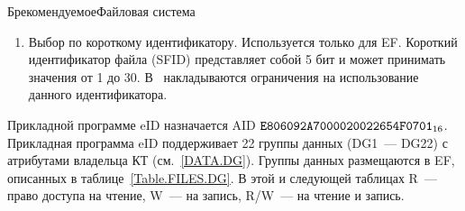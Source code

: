 \begin{appendix}{Б}{рекомендуемое}{Файловая система}
\begin{enumerate}
\item
Выбор по короткому идентификатору. Используется только для EF. Короткий
идентификатор файла (SFID) представляет собой 5 бит и может принимать значения
от 1 до 30. В~\cite{APDU} накладываются ограничения на использование данного
идентификатора.
\end{enumerate}


Прикладной программе eID назначается AID $\texttt{E806092A7000020022654F0701}_{16}$. 
%
Прикладная программа eID поддерживает 22 группы 
данных (DG1~--- DG22) с атрибутами владельца КТ (см.~\ref{DATA.DG}). 
%
Группы данных размещаются в EF, описанных в таблице~\ref{Table.FILES.DG}. 
%
В этой и следующей таблицах R~--- право доступа на чтение, W~--- на запись,  
R/W~--- на чтение и запись.
 

\end{appendix}
